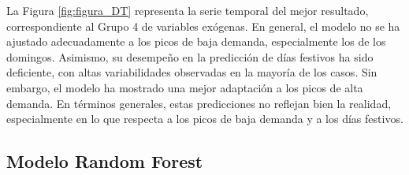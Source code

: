 \documentclass[12pt,a4paper]{report}
\begin{document}
La Figura \ref{fig:figura_DT} representa la serie temporal del mejor resultado, correspondiente al Grupo 4 de variables exógenas. En general, el modelo no se ha ajustado adecuadamente a los picos de baja demanda, especialmente los de los domingos. Asimismo, su desempeño en la predicción de días festivos ha sido deficiente, con altas variabilidades observadas en la mayoría de los casos. Sin embargo, el modelo ha mostrado una mejor adaptación a los picos de alta demanda. En términos generales, estas predicciones no reflejan bien la realidad, especialmente en lo que respecta a los picos de baja demanda y a los días festivos.

\subsection{Modelo Random Forest}
\end{document}
